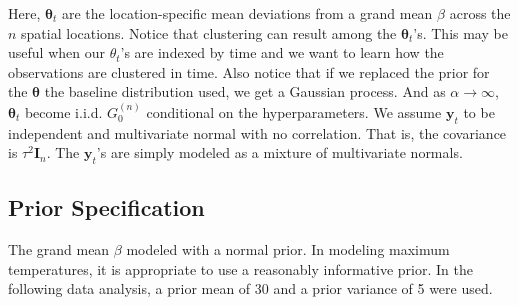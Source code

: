 \documentclass[11pt]{article}
\newcommand{\m}[1]{\mathbf{\bm{#1}}} %
\begin{document}
\noindent
Here, $\m\theta_t$ are the location-specific mean deviations from a grand mean
$\beta$ across the $n$ spatial locations. Notice that clustering can result
among the $\m\theta_t$'s. This may be useful when our $\theta_t$'s are indexed
by time and we want to learn how the observations are clustered in time.  Also
notice that if we replaced the prior for the $\m\theta$ the baseline
distribution used, we get a Gaussian process.  And as $\alpha \rightarrow
\infty$, $\m\theta_t$ become i.i.d. $G_0^{(n)}$ conditional on the
hyperparameters. We assume $\m y_t$ to be independent and multivariate
normal with no correlation. That is, the covariance is $\tau^2 \m I_n$.
The $\m y_t$'s are simply modeled as a mixture of multivariate normals.\\

\subsection{Prior Specification}
The grand mean $\beta$ modeled with a normal prior. In modeling maximum
temperatures, it is appropriate to use a reasonably informative prior. In the
following data analysis, a prior mean of 30 and a prior variance of 5 were used.
\end{document}
